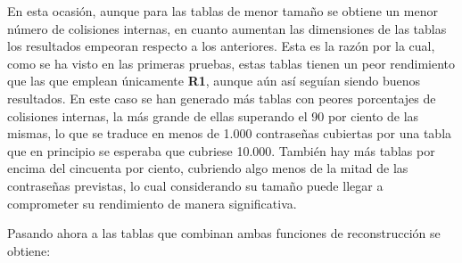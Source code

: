 \documentclass[12pt,spanish,listoffigures,listoftables,listofalgorithms]{tfgetsinf}
\begin{document}
En esta ocasión, aunque para las tablas de menor tamaño se obtiene un menor número de colisiones internas, en cuanto aumentan las dimensiones de las tablas los resultados empeoran respecto a los anteriores. Esta es la razón por la cual, como se ha visto en las primeras pruebas, estas tablas tienen un peor rendimiento que las que emplean únicamente \textbf{R1}, aunque aún así seguían siendo buenos resultados. En este caso se han generado más tablas con peores porcentajes de colisiones internas, la más grande de ellas superando el 90 por ciento de las mismas, lo que se traduce en menos de 1.000 contraseñas cubiertas por una tabla que en principio se esperaba que cubriese 10.000. También hay más tablas por encima del cincuenta por ciento, cubriendo algo menos de la mitad de las contraseñas previstas, lo cual considerando su tamaño puede llegar a comprometer su rendimiento de manera significativa.

Pasando ahora a las tablas que combinan ambas funciones de reconstrucción se obtiene:
\end{document}
